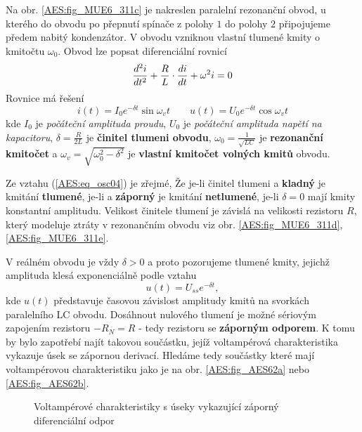       Na obr. \ref{AES:fig_MUE6_311c} je nakreslen paralelní rezonanční obvod, u kterého do obvodu 
      po přepnutí spínače z polohy \(1\) do polohy \(2\) připojujeme předem nabitý kondenzátor. V 
      obvodu vzniknou vlastní tlumené kmity o kmitočtu \(\omega_0\). Obvod lze popsat diferenciální 
      rovnicí
      \begin{equation}\label{AES:eq_osc04}
        \dfrac{d^2 i}{d t^2} + \frac{R}{L}\cdot\dfrac{d i}{d t} + \omega^2 i = 0
      \end{equation}
      Rovnice má řešení
      \begin{equation}
        i(t) = I_{0}e^{-\delta t}\sin\omega_v t  \qquad u(t) = U_{0}e^{-\delta t}\cos\omega_v t
      \end{equation}
      kde \(I_0\) je \emph{počáteční amplituda proudu}, \(U_0\) je \emph{počáteční amplituda napětí 
      na kapacitoru}, \(\delta = \frac{R}{2L}\) je \textbf{činitel tlumeni obvodu}, \(\omega_0 
      =\frac{1}{\sqrt{LC}}\) je \textbf{rezonanční kmitočet} a \(\omega_v = \sqrt{\omega^2_0 - 
      \delta^2}\) je \textbf{vlastní kmitočet volných kmitů} obvodu. 
      
      Ze vztahu (\ref{AES:eq_osc04}) je zřejmé, Že je-li činitel tlumeni a \textbf{kladný} je 
      kmitání \textbf{tlumené}, je-li a \textbf{záporný} je kmitání \textbf{netlumené}, je-li 
      \(\delta = 0\) mají kmity konstantní amplitudu. Velikost činitele tlumení je závislá na 
      velikosti rezistoru \(R\), který modeluje ztráty v rezonančním obvodu viz obr. 
      \ref{AES:fig_MUE6_311d}, \ref{AES:fig_MUE6_311e}.
      
      V reálném obvodu je vždy \(\delta > 0\) a proto pozorujeme tlumené kmity, jejichž amplituda 
      klesá exponenciálně podle vztahu 
      \begin{equation}\label{AES:eq_osc02}
        u(t) = U_{ss}e^{-\delta t},
      \end{equation}
      kde \(u(t)\) představuje časovou závislost amplitudy kmitů na svorkách paralelního LC obvodu. 
      Dosáhnout nulového tlumení je možné sériovým zapojením rezistoru \(-R_N = R\) - tedy 
      rezistoru se \textbf{záporným odporem}. K tomu by bylo zapotřebí najít takovou součástku, 
      jejíž voltampérová charakteristika vykazuje úsek se zápornou derivací. Hledáme tedy součástky 
      které mají voltampérovou charakteristiku jako je na obr. \ref{AES:fig_AES62a} nebo 
      \ref{AES:fig_AES62b}.
      
      \begin{figure}[ht!]
        \centering  
        \caption{Voltampérové charakteristiky s úseky vykazující záporný diferenciální odpor 
        \cite[s.~93]{Koucky1997}}
        \label{MIT:fig_AES_62}
      \end{figure}
      
